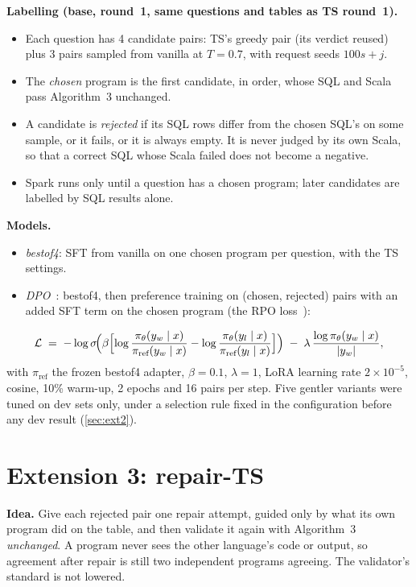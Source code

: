 \textbf{Labelling (base, round~1, same questions and tables as TS round~1).}
\begin{itemize}
\item Each question has 4 candidate pairs: TS's greedy pair (its verdict reused) plus 3 pairs sampled from vanilla at
$T=0.7$, with request seeds $100s+j$.
\item The \emph{chosen} program is the first candidate, in order, whose SQL and Scala pass Algorithm~3 unchanged.
\item A candidate is \emph{rejected} if its SQL rows differ from the chosen SQL's on some sample, or it fails, or it is
always empty. It is never judged by its own Scala, so that a correct SQL whose Scala failed does not become a negative.
\item Spark runs only until a question has a chosen program; later candidates are labelled by SQL results alone.
\end{itemize}

\textbf{Models.}
\begin{itemize}
\item \emph{bestof4}: SFT from vanilla on one chosen program per question, with the TS settings.
\item \emph{DPO}~\cite{rafailov2023dpo}: bestof4, then preference training on (chosen, rejected) pairs with an added
SFT term on the chosen program (the RPO loss~\cite{pang2024rpo}):
\end{itemize}
\begin{equation}
  \mathcal{L} \;=\; -\log\sigma\!\Bigl(\beta\Bigl[\log\frac{\pi_\theta(y_w\mid x)}{\pi_{\text{ref}}(y_w\mid x)} -
  \log\frac{\pi_\theta(y_l\mid x)}{\pi_{\text{ref}}(y_l\mid x)}\Bigr]\Bigr) \;-\; \lambda\,\frac{\log\pi_\theta(y_w\mid
  x)}{|y_w|},
\end{equation}
with $\pi_{\text{ref}}$ the frozen bestof4 adapter, $\beta=0.1$, $\lambda=1$, LoRA learning rate $2\times10^{-5}$,
cosine, 10\% warm-up, 2 epochs and 16 pairs per step. Five gentler variants were tuned on dev sets only, under a
selection rule fixed in the configuration before any dev result (\cref{sec:ext2}).

\section{Extension 3: repair-TS}\label{sec:method-repair}

\begin{oursbox}[title={Our extension (not in the paper)}]
\textbf{Idea.} Give each rejected pair one repair attempt, guided only by what its own program did on the table, and
then validate it again with Algorithm~3 \emph{unchanged}. A program never sees the other language's code or output, so
agreement after repair is still two independent programs agreeing. The validator's standard is not lowered.
\end{oursbox}

